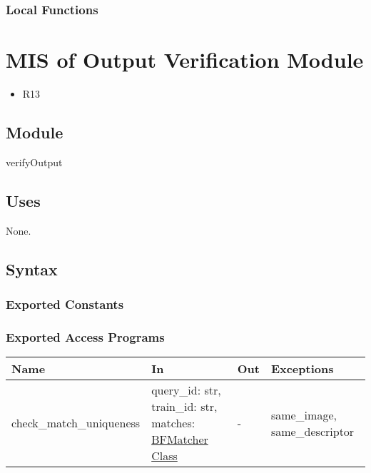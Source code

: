 \documentclass[12pt, titlepage]{article}
\begin{document}
\subsubsection{Local Functions}

 

\section{MIS of Output Verification Module} \label{mOV}
\begin{itemize}
  \item R13
\end{itemize}

\subsection{Module}

verifyOutput

\subsection{Uses}
None.

\subsection{Syntax}

\subsubsection{Exported Constants}

\subsubsection{Exported Access Programs}

\begin{center}
\begin{tabular}{p{4.5cm} p{4cm} p{4cm} p{3cm}}
\hline
\textbf{Name} & \textbf{In} & \textbf{Out} & \textbf{Exceptions} \\
\hline
check\_match\_uniqueness 
& query\_id: str, \newline
train\_id: str, \newline
matches: \href{https://docs.opencv.org/3.4/d3/da1/classcv_1_1BFMatcher.html}{BFMatcher Class}
& -  
& same\_image, \newline
same\_descriptor \\
\hline
\end{tabular}
\end{center}
\end{document}
